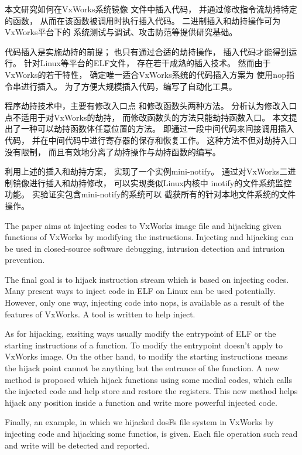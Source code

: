 \begin{cabstract}

本文研究如何在VxWorks系统镜像
文件中插入代码，
并通过修改指令流劫持特定的函数，
从而在该函数被调用时执行插入代码。
二进制插入和劫持操作可为VxWorks平台下的
系统测试与调试、攻击防范等提供研究基础。

代码插入是实施劫持的前提；
也只有通过合适的劫持操作，
插入代码才能得到运行。
针对Linux等平台的ELF文件，
存在若干成熟的插入技术。
然而由于VxWorks的若干特性，
确定唯一适合VxWorks系统的代码插入方案为
使用nop指令串进行插入。
为了方便大规模插入代码，编写了自动化工具。

程序劫持技术中，主要有修改入口点
和修改函数头两种方法。
分析认为修改入口点不适用于对VxWorks的劫持，
而修改函数头的方法只能劫持函数入口。
本文提出了一种可以劫持函数体任意位置的方法。
即通过一段中间代码来间接调用插入代码，
并在中间代码中进行寄存器的保存和恢复工作。
这种方法不但对劫持入口没有限制，
而且有效地分离了劫持操作与劫持函数的编写。

利用上述的插入和劫持方案，
实现了一个实例mini-notify。
通过对VxWorks二进制镜像进行插入和劫持修改，
可以实现类似Linux内核中
inotify的文件系统监控功能。
实验证实包含mini-notify的系统可以
截获所有的针对本地文件系统的文件操作。

\end{cabstract}
\begin{eabstract}
The paper aims at injecting codes to VxWorks image file 
and hijacking given functions of VxWorks by modifying the 
instructions. 
Injecting and hijacking can be used in closed-source software 
debugging, intrusion detection and intrusion prevention.
 
The final goal is to hijack instruction stream
 which is based on injecting codes.
Many present ways to inject code in ELF on Linux 
can be used potentially.
However, only one way, injecting code into nops, 
is available as a result of the features of VxWorks. 
A tool is written to help inject.
 
As for hijacking, exsiting ways usually modify
the entrypoint of ELF or the starting 
instructions of a function.
To modify the entrypoint doesn't apply to VxWorks image.
On the other hand, to modify the 
starting instructions means the hijack point 
cannot be anything but the entrance of the function.
A new method is proposed which hijack functions 
using some medial codes, which calls the 
injected code and help store and restore 
the registers. 
This new method helps hijack any position inside a 
function and write more powerful injected code.

Finally, an example, in which we hijacked dosFs file system 
in VxWorks by injecting code and hijacking some functios, is given.
Each file operation such read and write will be 
detected and reported.   





\end{eabstract}

